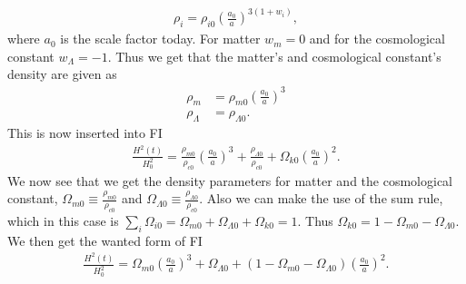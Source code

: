 \documentclass{emulateapj}
\begin{document}
	\begin{align}
	\rho_i = \rho_{i0}\left(\frac{a_0}{a}\right)^{3(1+w_i)},
	\end{align}
	where $a_0$ is the scale factor today. For matter $w_m=0$ and for the cosmological constant $w_\Lambda = -1$. Thus we get that the matter's and cosmological constant's density are given as
	\begin{align}
		\rho_m &= \rho_{m0}\left(\frac{a_0}{a}\right)^3\\
		\rho_\Lambda & = \rho_{\Lambda 0}.
	\end{align}
	This is now inserted into FI
	\begin{align}
		\frac{H^2(t)}{H_0^2} = \frac{\rho_{m0}}{\rho_{c0}}\left(\frac{a_0}{a}\right)^3 + \frac{\rho_{\Lambda 0}}{\rho_{c0}} + \Omega_{k0}\left(\frac{a_0}{a}\right)^2.
	\end{align}
	We now see that we get the density parameters for matter and the cosmological constant, $\Omega_{m 0}\equiv \frac{\rho_{m0}}{\rho_{c0}}$ and $\Omega_{\Lambda 0}\equiv \frac{\rho_{\Lambda 0}}{\rho_{c0}}$. Also we can make the use of the sum rule, which in this case is $\sum_{i} \Omega_{i0} = \Omega_{m 0} + \Omega_{\Lambda 0} + \Omega_{k0} = 1$. Thus $\Omega_{k0} = 1 - \Omega_{m 0} - \Omega_{\Lambda 0}$. We then get the wanted form of FI
	\begin{align}
		\frac{H^2(t)}{H_0^2} = \Omega_{m 0}\left(\frac{a_0}{a}\right)^3 + \Omega_{\Lambda 0} + (1 - \Omega_{m 0} - \Omega_{\Lambda 0})\left(\frac{a_0}{a}\right)^2.
		\label{eq:FI}
	\end{align}
	
\end{document}
